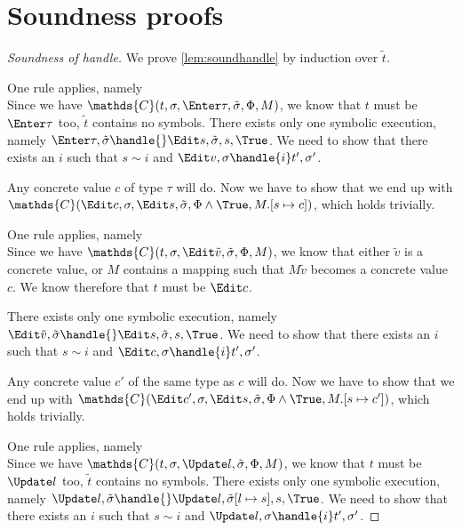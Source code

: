 
\section{Soundness proofs}
\label{sec:soundnessproofs}


\begin{proof}[Soundness of handle]

  We prove \cref{lem:soundhandle} by induction over $\tilde{t}$.

 {One rule applies, namely \\
 Since we have $\mathds{C}(t,\sigma,\Enter \tau,\tilde{\sigma},\Phi,M)$, we know that $t$ must be $\Enter \tau$ too, $\tilde{t}$ contains no symbols.
 There exists only one symbolic execution, namely $\Enter \tau,\tilde{\sigma}\handle{}\Edit s,\tilde{\sigma},s,\True$.
 We need to show that there exists an $i$ such that $s\sim i$ and $\Edit v,\sigma\handle{i}t',\sigma'$.

 Any concrete value $c$ of type $\tau$ will do. Now we have to show that we end up with $\mathds{C}(\Edit c,\sigma,\Edit s,\tilde{\sigma},\Phi\land\True,M.[s\mapsto c])$, which holds trivially.
 }

  {One rule applies, namely \\
  Since we have $\mathds{C}(t,\sigma,\Edit \tilde{v},\tilde{\sigma},\Phi,M)$, we know that either $\tilde{v}$ is a concrete value, or $M$ contains a mapping such that $M\tilde{v}$ becomes a concrete value $c$. We know therefore that $t$ must be $\Edit c$.

  There exists only one symbolic execution, namely $\Edit \tilde{v},\tilde{\sigma}\handle{}\Edit s,\tilde{\sigma},s,\True$.
  We need to show that there exists an $i$ such that $s\sim i$ and $\Edit c,\sigma\handle{i}t',\sigma'$.

  Any concrete value $c'$ of the same type as $c$ will do. Now we have to show that we end up with $\mathds{C}(\Edit c',\sigma,\Edit s,\tilde{\sigma},\Phi\land\True,M.[s\mapsto c'])$, which holds trivially.
  }


{One rule applies, namely \\

Since we have $\mathds{C}(t,\sigma,\Update l,\tilde{\sigma},\Phi,M)$, we know that $t$ must be $\Update l$ too, $\tilde{t}$ contains no symbols.
There exists only one symbolic execution, namely $\Update l,\tilde{\sigma}\handle{}\Update l,\tilde{\sigma}[l\mapsto s],s,\True$.
We need to show that there exists an $i$ such that $s\sim i$ and $\Update l,\sigma\handle{i}t',\sigma'$.

}
\end{proof}
